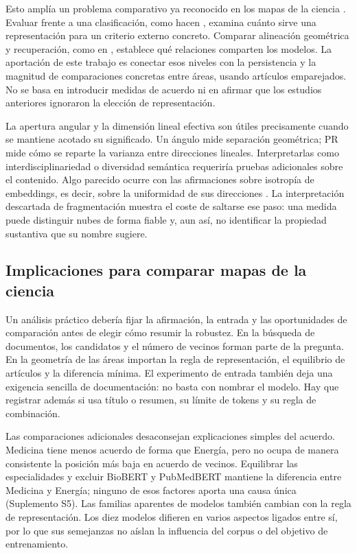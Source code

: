 \documentclass[12pt]{article}
\begin{document}
Esto amplía un problema comparativo ya reconocido en los mapas de la ciencia \citep{refa0d2d707e6,ref6a2f5912bc}. Evaluar frente a una clasificación, como hacen \citet{refc0e2cc29e0}, examina cuánto sirve una representación para un criterio externo concreto. Comparar alineación geométrica y recuperación, como en \citet{ref4e1e0d5582}, establece qué relaciones comparten los modelos. La aportación de este trabajo es conectar esos niveles con la persistencia y la magnitud de comparaciones concretas entre áreas, usando artículos emparejados. No se basa en introducir medidas de acuerdo ni en afirmar que los estudios anteriores ignoraron la elección de representación.

La apertura angular y la dimensión lineal efectiva son útiles precisamente cuando se mantiene acotado su significado. Un ángulo mide separación geométrica; PR mide cómo se reparte la varianza entre direcciones lineales. Interpretarlas como interdisciplinariedad o diversidad semántica requeriría pruebas adicionales sobre el contenido. Algo parecido ocurre con las afirmaciones sobre isotropía de embeddings, es decir, sobre la uniformidad de sus direcciones \citep{rudman-etal-2022-isoscore}. La interpretación descartada de fragmentación muestra el coste de saltarse ese paso: una medida puede distinguir nubes de forma fiable y, aun así, no identificar la propiedad sustantiva que su nombre sugiere.

\subsection{Implicaciones para comparar mapas de la ciencia}
Un análisis práctico debería fijar la afirmación, la entrada y las oportunidades de comparación antes de elegir cómo resumir la robustez. En la búsqueda de documentos, los candidatos y el número de vecinos forman parte de la pregunta. En la geometría de las áreas importan la regla de representación, el equilibrio de artículos y la diferencia mínima. El experimento de entrada también deja una exigencia sencilla de documentación: no basta con nombrar el modelo. Hay que registrar además si usa título o resumen, su límite de tokens y su regla de combinación.

Las comparaciones adicionales desaconsejan explicaciones simples del acuerdo. Medicina tiene menos acuerdo de forma que Energía, pero no ocupa de manera consistente la posición más baja en acuerdo de vecinos. Equilibrar las especialidades y excluir BioBERT y PubMedBERT mantiene la diferencia entre Medicina y Energía; ninguno de esos factores aporta una causa única (Suplemento S5). Las familias aparentes de modelos también cambian con la regla de representación. Los diez modelos difieren en varios aspectos ligados entre sí, por lo que sus semejanzas no aíslan la influencia del corpus o del objetivo de entrenamiento.
\end{document}
